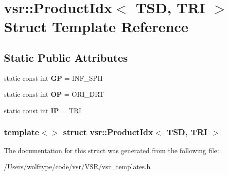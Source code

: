 \hypertarget{structvsr_1_1_product_idx_3_01_t_s_d_00_01_t_r_i_01_4}{\section{vsr\-:\-:Product\-Idx$<$ T\-S\-D, T\-R\-I $>$ Struct Template Reference}
\label{structvsr_1_1_product_idx_3_01_t_s_d_00_01_t_r_i_01_4}
}
\subsection*{Static Public Attributes}
\begin{DoxyCompactItemize}
\item 
\hypertarget{structvsr_1_1_product_idx_3_01_t_s_d_00_01_t_r_i_01_4_a661872596c536c280a70b78d95a91f0b}{static const int {\bfseries G\-P} = I\-N\-F\-\_\-\-S\-P\-H}\label{structvsr_1_1_product_idx_3_01_t_s_d_00_01_t_r_i_01_4_a661872596c536c280a70b78d95a91f0b}

\item 
\hypertarget{structvsr_1_1_product_idx_3_01_t_s_d_00_01_t_r_i_01_4_aeb59cc6481b35065acdce7f93658055b}{static const int {\bfseries O\-P} = O\-R\-I\-\_\-\-D\-R\-T}\label{structvsr_1_1_product_idx_3_01_t_s_d_00_01_t_r_i_01_4_aeb59cc6481b35065acdce7f93658055b}

\item 
\hypertarget{structvsr_1_1_product_idx_3_01_t_s_d_00_01_t_r_i_01_4_a39215a4bc282cefc0dd53d3a41eda15f}{static const int {\bfseries I\-P} = T\-R\-I}\label{structvsr_1_1_product_idx_3_01_t_s_d_00_01_t_r_i_01_4_a39215a4bc282cefc0dd53d3a41eda15f}

\end{DoxyCompactItemize}
\subsubsection*{template$<$$>$ struct vsr\-::\-Product\-Idx$<$ T\-S\-D, T\-R\-I $>$}



The documentation for this struct was generated from the following file\-:\begin{DoxyCompactItemize}
\item 
/\-Users/wolftype/code/vsr/\-V\-S\-R/vsr\-\_\-templates.\-h\end{DoxyCompactItemize}
